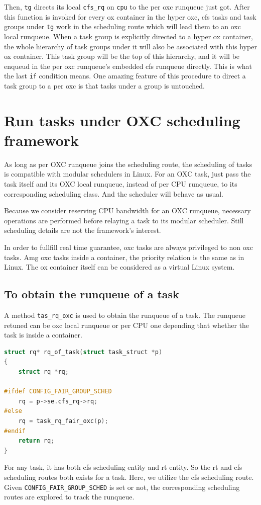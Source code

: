 Then, \texttt{tg} directs its local \texttt{cfs\_rq} on \texttt{cpu} to 
the per oxc runqueue just got. After this function is invoked for every
ox container in the hyper oxc, cfs tasks and task groups 
under \texttt{tg} work in the scheduling route which will lead them to an 
oxc local runqueue. When a task group is explicitly directed to a hyper
ox container, the whole hierarchy of task groups under it will also be
associated with this hyper ox container. This task group will be the top of
this hierarchy, and it will be enqueud in the per oxc runqueue's embedded cfs 
runqueue directly. This is what the last \texttt{if} condition means.
One amazing feature of this procedure to direct a task group to a per oxc 
is that tasks under a group is untouched.

\section{Run tasks under OXC scheduling framework}
As long as per OXC runqueue joins the scheduling route, the scheduling 
of tasks is compatible with modular schedulers in Linux. For an OXC task,
just pass the task itself and its OXC local runqueue, instead of per CPU
runqueue, to its corresponding scheduling class. And the scheduler will
behave as usual.

Because we consider reserving CPU bandwidth for an OXC runqueue, necessary
operations are performed before relaying a task to its modular scheduler.
Still scheduling details are not the framework's interest. 

In order to fullfill real time guarantee, oxc tasks are always privileged
to non oxc tasks. Amg oxc tasks inside a container, the priority relation
is the same as in Linux. The ox container itself can be considered as a 
virtual Linux system.

\subsection{To obtain the runqueue of a task}
A method \texttt{tas\_rq\_oxc} is used to obtain the runqueue of a task.
The runqueue retuned can be oxc local runqueue or per CPU one depending
that whether the task is inside a container.
\begin{lstlisting}[language=C]
struct rq* rq_of_task(struct task_struct *p)
{
	struct rq *rq;

#ifdef CONFIG_FAIR_GROUP_SCHED
	rq = p->se.cfs_rq->rq;
#else
	rq = task_rq_fair_oxc(p);
#endif
	return rq;
}
\end{lstlisting}
For any task, it has both cfs scheduling entity and rt entity. So the
rt and cfs scheduling routes both exists for a task. Here, we utilize
the cfs scheduling route. Given \texttt{CONFIG\_FAIR\_GROUP\_SCHED}
is set or not, the corresponding scheduling routes are explored to
track the runqueue.

